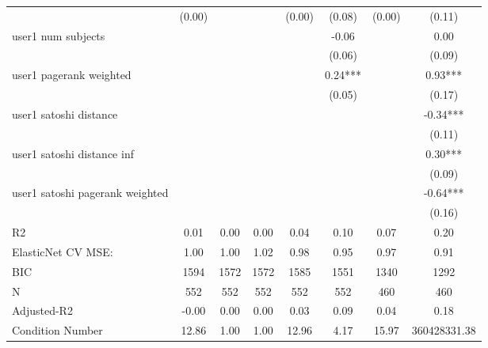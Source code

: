 \begin{table*}
\begin{center}
\begin{tabular}{lccccccc}
                                                 & (0.00)   &            &         & (0.00)  & (0.08)   & (0.00)             & (0.11)        \\
user1 num subjects                               &          &            &         &         & -0.06    &                    & 0.00          \\
                                                 &          &            &         &         & (0.06)   &                    & (0.09)        \\
user1 pagerank weighted                          &          &            &         &         & 0.24***  &                    & 0.93***       \\
                                                 &          &            &         &         & (0.05)   &                    & (0.17)        \\
user1 satoshi distance                           &          &            &         &         &          &                    & -0.34***      \\
                                                 &          &            &         &         &          &                    & (0.11)        \\
user1 satoshi distance inf                       &          &            &         &         &          &                    & 0.30***       \\
                                                 &          &            &         &         &          &                    & (0.09)        \\
user1 satoshi pagerank weighted                  &          &            &         &         &          &                    & -0.64***      \\
                                                 &          &            &         &         &          &                    & (0.16)        \\
R2                                               & 0.01     & 0.00       & 0.00    & 0.04    & 0.10     & 0.07               & 0.20          \\
ElasticNet CV MSE:                               & 1.00     & 1.00       & 1.02    & 0.98    & 0.95     & 0.97               & 0.91          \\
BIC                                              & 1594     & 1572       & 1572    & 1585    & 1551     & 1340               & 1292          \\
N                                                & 552      & 552        & 552     & 552     & 552      & 460                & 460           \\
Adjusted-R2                                      & -0.00    & 0.00       & 0.00    & 0.03    & 0.09     & 0.04               & 0.18          \\
Condition Number                                 & 12.86    & 1.00       & 1.00    & 12.96   & 4.17     & 15.97              & 360428331.38  \\
\hline
\end{tabular}
\end{center}
\end{table*}
